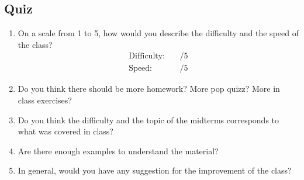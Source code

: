 \begin{center}\section*{Quiz }\end{center}

\begin{enumerate}
\item On a scale from 1 to 5, how would you describe the difficulty and the speed of the class?
\[\begin{array}{lcr}\text{Difficulty:}& \ & /5 \\ \text{Speed:} & \ & /5 \end{array} \] 

\item Do you think there should be more homework? More pop quizz? More in class exercises?
\vskip 2in
\item Do you think the difficulty and the topic of the midterms corresponds to what was covered in class?
\vskip 2in
\item Are there enough examples to understand the material?
\vskip 2in
\item In general, would you have any suggestion for the improvement of the class?  
\end{enumerate}
